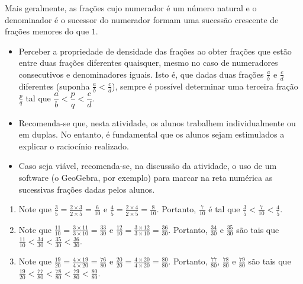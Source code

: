\begin{atividade}
  Mais geralmente, as frações cujo numerador é um número natural e o denominador
é o sucessor do numerador formam uma sucessão crescente de frações menores do
que   $1$.

\end{atividade}

\begin{atividade}\label{chap4-ativ25}
\objetivos
\begin{itemize} %
    \item       Perceber a propriedade de densidade das frações ao obter frações
que estão entre duas frações diferentes quaisquer, mesmo no caso de numeradores
consecutivos e denominadores iguais. Isto é, que dadas duas frações
$\frac{a}{b}$       e       $\frac{c}{d}$       diferentes (suponha
$\frac{a}{b}<\frac{c}{d}$), sempre é possível determinar uma terceira fração
  $\frac{p}{q}$       tal que       $\dfrac{a}{b}<\dfrac{p}{q}<\dfrac{c}{d}$.
\end{itemize} %

\discussoes
\begin{itemize} %
    \item       Recomenda-se que, nesta atividade, os alunos trabalhem
individualmente ou em duplas. No entanto, é fundamental que os alunos sejam
estimulados a explicar o raciocínio realizado.
    \item       Caso seja viável, recomenda-se, na discussão da atividade, o uso
de um software (o GeoGebra, por exemplo) para marcar na reta numérica as
sucessivas frações dadas pelos alunos.
\end{itemize} %

\solucao
\begin{enumerate} %
    \item       Note que       $\frac{3}{5} = \frac{2 \times 3}{2 \times 5} =
\frac{6}{10}$       e       $\frac{4}{5} = \frac{2 \times 4}{2 \times 5} =
\frac{8}{10}$. Portanto,       $\frac{7}{10}$       é tal que       $\frac{3}{5}
< \frac{7}{10} < \frac{4}{5}$.
    \item       Note que       $\frac{11}{10} = \frac{3 \times 11}{3 \times 10}
= \frac{33}{30}$       e       $\frac{12}{10} = \frac{3 \times 12}{3 \times 10}
= \frac{36}{30}$. Portanto,       $\frac{34}{30}$       e       $\frac{35}{30}$
     são tais que       $\frac{11}{10} < \frac{34}{30} < \frac{35}{30} <
\frac{36}{30}$.
    \item       Note que       $\frac{19}{20} = \frac{4 \times 19}{4 \times 20}
= \frac{76}{80}$       e       $\frac{20}{20} = \frac{4 \times 20}{4 \times 20}
= \frac{80}{80}$. Portanto,       $\frac{77}{80}$,       $\frac{78}{80}$       e
      $\frac{79}{80}$       são tais que       $\frac{19}{20} < \frac{77}{80} <
\frac{78}{80} < \frac{79}{80} < \frac{80}{80}$.
\end{enumerate} %
\end{atividade}

\anotacoes

\anotacoes

\anotacoes